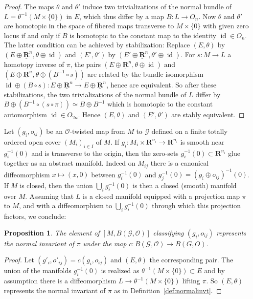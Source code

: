 \documentclass[reqno]{amsart}
\theoremstyle{theorem}
\newtheorem{proposition}[corollary]{Proposition}
\theoremstyle{remark}
\theoremstyle{definition}
\newcommand{\bR}{\mathbf{R}}
\newcommand{\R}{\mathbf{R}}
\newcommand{\GG}{\mathcal{G}}
\newcommand{\OO}{\mathcal{O}}
\DeclareMathOperator{\id}{id}
\begin{document}
\begin{proof}
The maps $\theta$ and $\theta'$ induce two trivializations of the normal bundle of $L=\theta^{-1}(M\times\{0\})$ in $E$, which thus
differ by a map $B:L\to O_n$. Now $\theta$ and $\theta'$ are homotopic in the space of fibered maps transverse to $M\times\{0\}$ with
given zero locus if and only if $B$ is homotopic to the constant map to the identity $\id \in O_n$. The latter condition can be achieved by stabilization:
Replace $(E,\theta)$ by $(E \oplus \underline{\R}^n, \theta \oplus \id )$ and  $(E',\theta')$ by $(E'\oplus \underline{\R}^n,\theta'\oplus \id)$. For $s:M\to L$
 a homotopy inverse of $\pi$, the pairs $(E \oplus \underline{\R}^n, \theta \oplus \id )$ and $(E   \oplus \underline{\R}^n, \theta \oplus ( B^{-1}\circ s))$ are related by the bundle isomorphism $\id \oplus (B \circ s): E \oplus \underline{\R}^n \to E \oplus \underline{\R}^n$, hence are equivalent.  So after these stabilizations,
the two trivializations of the normal bundle of $L$ differ by $B\oplus (B^{-1}\circ (s \circ \pi))\simeq B \oplus B^{-1}$ which is
homotopic to the constant automorphism $\id \in O_{2n}$. Hence $(E,\theta)$ and $(E',\theta')$ are stably equivalent.
\end{proof}


Let $(g_i,o_{ij})$ be an $\OO$-twisted map from $M$ to $\GG$ defined on a finite
totally ordered open cover $(M_i)_{i\in I}$ of $M$. If $g_i\colon M_i\times \bR^{n_i}\to \bR^{n_i}$ is smooth near $g_i^{-1}(0)$ and is transverse to the origin, then the zero-sets $g_i^{-1}(0) \subset \bR^{n_i}$ glue together as an abstract manifold. Indeed on $M_{ij}$ there is a canonical diffeomorphism $x \mapsto (x,0)$ between $g_i^{-1}(0)$ and $g_j^{-1}(0)=(g_i \oplus o_{ij})^{-1}(0)$. If $M$ is closed, then the union $\bigcup_i g_i^{-1}(0)$ is then a closed (smooth) manifold over $M$. Assuming that $L$ is a closed manifold equipped with a projection map $\pi$ to $M$, and with a diffeomorphism to $\bigcup_i g_i^{-1}(0)$ through which this projection factors, we conclude: 


\begin{proposition}\label{prop:recognizeNI}
The element of $[M, B(\GG,\OO)]$ classifying $(g_i,o_{ij})$ represents the normal invariant
of $\pi$ under the map $c:B(\GG,\OO)\to B(G,O)$.
\end{proposition}


\begin{proof}
Let $(g'_i,o'_{ij})=c(g_i,o_{ij})$ and $(E,\theta)$ the corresponding pair.
The union of the manifolds $g_i^{-1}(0)$ is realized as $\theta^{-1}(M\times\{0\}) \subset E$
and by assumption there is a diffeomorphism $L\to \theta^{-1}(M\times\{0\})$ lifting $\pi$.
So $(E,\theta)$ represents the normal invariant of $\pi$ as in Definition~\ref{def:normalinvt}.
\end{proof}
\end{document}
